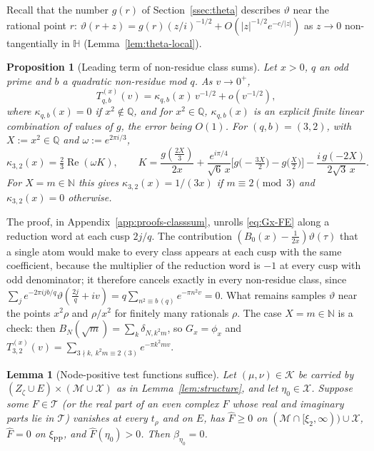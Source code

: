 \documentclass[11pt]{amsart}
\newcommand{\NN}{\mathbb N}
\newcommand{\QQ}{\mathbb Q}
\renewcommand{\Re}{\operatorname{Re}}
\newcommand{\hF}{\widehat F}
\newcommand{\xin}[1]{\xi_{#1}}
\newcommand{\BRS}{\mathcal M}
\newcommand{\xiPP}{\xi_{\mathrm{PP}}}
\newcommand{\Zz}{Z_\zeta}
\newcommand{\Tc}{\mathcal T}
\newcommand{\Kad}{\mathcal K}
\newtheorem{proposition}[theorem]{Proposition}
\newtheorem{lemma}[theorem]{Lemma}
\theoremstyle{definition}
\theoremstyle{remark}
\numberwithin{equation}{section}
\begin{document}
Recall that the number $g(r)$ of Section~\ref{ssec:theta} describes $\vartheta$ near the rational point $r$:
$\vartheta(r+z)=g(r)(z/i)^{-1/2}+O(|z|^{-1/2}e^{-c/|z|})$ as $z\to0$ non-tangentially in $\mathbb H$ (Lemma~\ref{lem:theta-local}).

\begin{proposition}[Leading term of non-residue class sums]\label{prop:classsum}
Let $x>0$, $q$ an odd prime and $b$ a quadratic non-residue mod $q$. As $v\to0^+$,
\[
T^{(x)}_{q,b}(v)=\kappa_{q,b}(x)\,v^{-1/2}+o(v^{-1/2}),
\]
where $\kappa_{q,b}(x)=0$ if $x^2\notin\QQ$, and for $x^2\in\QQ$, $\kappa_{q,b}(x)$ is an explicit finite linear combination of values of
$g$, the error being $O(1)$. For $(q,b)=(3,2)$, with $X:=x^2\in\QQ$ and $\omega:=e^{2\pi i/3}$,
\[
\kappa_{3,2}(x)=\tfrac23\Re(\omega K),\qquad K=\frac{g(\frac{2X}3)}{2x}+\frac{e^{i\pi/4}}{\sqrt6\,x}\Big[g\big(-\tfrac{3X}2\big)-g\big(\tfrac X2\big)\Big]-\frac{i\,g(-2X)}{2\sqrt3\,x}.
\]
For $X=m\in\NN$ this gives $\kappa_{3,2}(x)=1/(3x)$ if $m\equiv2\pmod3$ and $\kappa_{3,2}(x)=0$ otherwise.
\end{proposition}

The proof, in Appendix~\ref{app:proofs-classsum}, unrolls \eqref{eq:Gx-FE} along a reduction word at each cusp $2j/q$. The
contribution $(B_0(x)-\frac1{2x})\vartheta(\tau)$ that a single atom would make to every class appears at each cusp with the same
coefficient, because the multiplier of the reduction word is $-1$ at every cusp with odd denominator; it therefore cancels
exactly in every non-residue class, since $\sum_je^{-2\pi ijb/q}\vartheta(\frac{2j}q+iv)=q\sum_{n^2\equiv b\,(q)}e^{-\pi n^2v}=0$. What remains
samples $\vartheta$ near the points $x^2\rho$ and $\rho/x^2$ for finitely many rationals $\rho$. The case $X=m\in\NN$ is a check:
then $B_N(\sqrt m)=\sum_k\delta_{N,k^2m}$, so $G_x=\phi_x$ and $T^{(x)}_{3,2}(v)=\sum_{3\nmid k,\ k^2m\equiv2\,(3)}e^{-\pi k^2mv}$.

\begin{lemma}[Node-positive test functions suffice]\label{lem:P0}
Let $(\mu,\nu)\in\Kad$ be carried by $(\Zz\cup E)\times(\BRS\cup\mathcal X)$ as in Lemma~\ref{lem:structure}, and let $\eta_0\in\mathcal X$.
Suppose some $F\in\Tc$ (or the real part of an even complex $F$ whose real and imaginary parts lie in $\Tc$) vanishes at every
$t_\rho$ and on $E$, has $\hF\ge0$ on $(\BRS\cap[\xin2,\infty))\cup\mathcal X$, $\hF=0$ on $\xiPP$, and $\hF(\eta_0)>0$. Then $\beta_{\eta_0}=0$.
\end{lemma}
\end{document}
